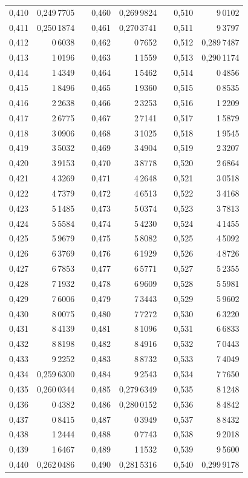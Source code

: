 \begin{tabular}{|r|r|@{}p{9pt}@{}|r|r|@{}p{9pt}@{}|r|r|}
0,410 & 0,249\,7705 &  & 0,460 & 0,269\,9824 &  & 0,510 & 9\,0102 \\[3pt]
0,411 & 0,250\,1874 &  & 0,461 & 0,270\,3741 &  & 0,511 & 9\,3797 \\
0,412 & 0\,6038 &  & 0,462 & 0\,7652 &  & 0,512 & 0,289\,7487 \\
0,413 & 1\,0196 &  & 0,463 & 1\,1559 &  & 0,513 & 0,290\,1174 \\
0,414 & 1\,4349 &  & 0,464 & 1\,5462 &  & 0,514 & 0\,4856 \\
0,415 & 1\,8496 &  & 0,465 & 1\,9360 &  & 0,515 & 0\,8535 \\[3pt]
0,416 & 2\,2638 &  & 0,466 & 2\,3253 &  & 0,516 & 1\,2209 \\
0,417 & 2\,6775 &  & 0,467 & 2\,7141 &  & 0,517 & 1\,5879 \\
0,418 & 3\,0906 &  & 0,468 & 3\,1025 &  & 0,518 & 1\,9545 \\
0,419 & 3\,5032 &  & 0,469 & 3\,4904 &  & 0,519 & 2\,3207 \\
0,420 & 3\,9153 &  & 0,470 & 3\,8778 &  & 0,520 & 2\,6864 \\[3pt]
0,421 & 4\,3269 &  & 0,471 & 4\,2648 &  & 0,521 & 3\,0518 \\
0,422 & 4\,7379 &  & 0,472 & 4\,6513 &  & 0,522 & 3\,4168 \\
0,423 & 5\,1485 &  & 0,473 & 5\,0374 &  & 0,523 & 3\,7813 \\
0,424 & 5\,5584 &  & 0,474 & 5\,4230 &  & 0,524 & 4\,1455 \\
0,425 & 5\,9679 &  & 0,475 & 5\,8082 &  & 0,525 & 4\,5092 \\[3pt]
0,426 & 6\,3769 &  & 0,476 & 6\,1929 &  & 0,526 & 4\,8726 \\
0,427 & 6\,7853 &  & 0,477 & 6\,5771 &  & 0,527 & 5\,2355 \\
0,428 & 7\,1932 &  & 0,478 & 6\,9609 &  & 0,528 & 5\,5981 \\
0,429 & 7\,6006 &  & 0,479 & 7\,3443 &  & 0,529 & 5\,9602 \\
0,430 & 8\,0075 &  & 0,480 & 7\,7272 &  & 0,530 & 6\,3220 \\[3pt]
0,431 & 8\,4139 &  & 0,481 & 8\,1096 &  & 0,531 & 6\,6833 \\
0,432 & 8\,8198 &  & 0,482 & 8\,4916 &  & 0,532 & 7\,0443 \\
0,433 & 9\,2252 &  & 0,483 & 8\,8732 &  & 0,533 & 7\,4049 \\
0,434 & 0,259\,6300 &  & 0,484 & 9\,2543 &  & 0,534 & 7\,7650 \\
0,435 & 0,260\,0344 &  & 0,485 & 0,279\,6349 &  & 0,535 & 8\,1248 \\[3pt]
0,436 & 0\,4382 &  & 0,486 & 0,280\,0152 &  & 0,536 & 8\,4842 \\
0,437 & 0\,8415 &  & 0,487 & 0\,3949 &  & 0,537 & 8\,8432 \\
0,438 & 1\,2444 &  & 0,488 & 0\,7743 &  & 0,538 & 9\,2018 \\
0,439 & 1\,6467 &  & 0,489 & 1\,1532 &  & 0,539 & 9\,5600 \\
0,440 & 0,262\,0486 &  & 0,490 & 0,281\,5316 &  & 0,540 & 0,299\,9178 \\
\hline
\end{tabular}\par
